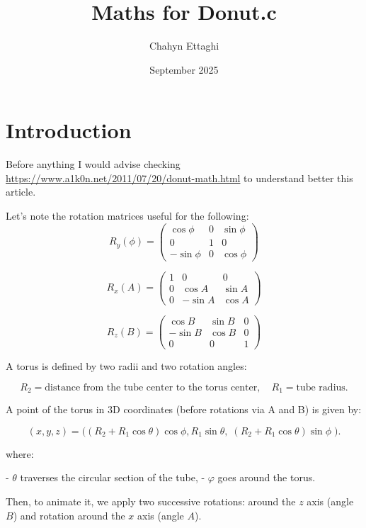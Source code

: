 \documentclass{article}
\title{Maths for Donut.c}
\author{Chahyn Ettaghi}
\date{September 2025}
\begin{document}
\maketitle

\section{Introduction}
Before anything I would advise checking \underline{https://www.a1k0n.net/2011/07/20/donut-math.html} to understand better this article.

Let's note the rotation matrices useful for the following: 
\[
R_y(\phi) =
\begin{pmatrix}
\cos\phi & 0 & \sin\phi \\
0 & 1 & 0 \\
-\sin\phi & 0 & \cos\phi
\end{pmatrix}
\]

\[
R_x(A) =
\begin{pmatrix}
1 & 0 & 0 \\
0 & \cos A & \sin A \\
0 & -\sin A & \cos A
\end{pmatrix}
\]

\[
R_z(B) =
\begin{pmatrix}
\cos B & \sin B & 0 \\
-\sin B & \cos B & 0 \\
0 & 0 & 1
\end{pmatrix}
\]

A torus is defined by two radii and two rotation angles: 

\[
R_2 = \text{distance from the tube center to the torus center}, \quad
R_1 = \text{tube radius}.
\]

A point of the torus in 3D coordinates (before rotations via A and B) is given by: 

\[
(x,y,z) =
\bigl((R_2 + R_1 \cos \theta)\cos \phi, R_1 \sin \theta,\; 
(R_2 + R_1 \cos \theta)\sin \phi \; 
 \bigr).
\]

where:  

- $\theta$ traverses the circular section of the tube,  
- $\varphi$ goes around the torus.  

\medskip

Then, to animate it, we apply two successive rotations: around the $z$ axis (angle $B$) and rotation around the $x$ axis (angle $A$).  

\medskip
\end{document}
